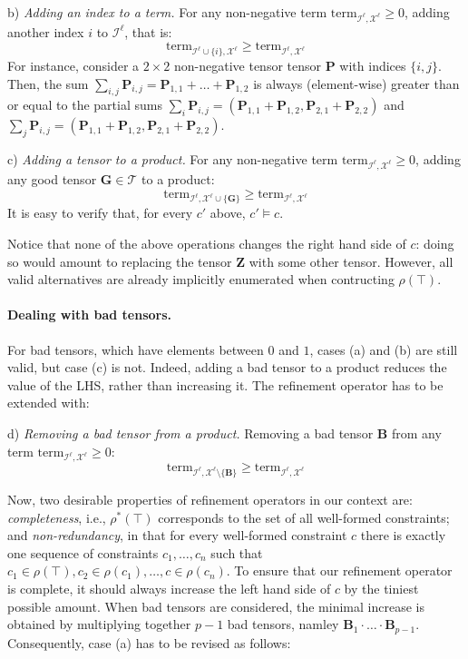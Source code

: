 \documentclass{article}
\newcommand{\tensors}{\ensuremath{\mathcal{T}}\xspace}
\newcommand{\indices}{\ensuremath{\mathcal{I}}\xspace}
\newcommand{\factors}{\ensuremath{\mathcal{X}}\xspace}
\newcommand{\TERM}[2]{\ensuremath{\mathrm{term}_{#1,#2}}\xspace}
\renewcommand\[{\begin{equation}}
\renewcommand\]{\end{equation}}
\newcommand{\TB}{\textbf{B}\xspace}
\newcommand{\TG}{\textbf{G}\xspace}
\newcommand{\TP}{\textbf{P}\xspace}
\newcommand{\TZ}{\textbf{Z}\xspace}
\begin{document}
b) \emph{Adding an index to a term.}  For any non-negative term
$\TERM{\indices^\ell}{\factors^\ell} \ge 0$, adding another index $i$ to
$\indices^\ell$, that is:
%
$$
    \textstyle
    \TERM{\indices^\ell \cup \{i\}}{\factors^\ell} \ge \TERM{\indices^\ell}{\factors^\ell}
$$
%
For instance, consider a $2 \times 2$ non-negative tensor tensor $\TP$ with
indices $\{i, j\}$.  Then, the sum
$\sum_{i,j} \TP_{i,j} = \TP_{1,1} + \ldots + \TP_{1,2}$
is always (element-wise) greater than or equal to the partial sums
$\sum_i \TP_{i,j} = (\TP_{1,1} + \TP_{1,2}, \TP_{2,1} + \TP_{2,2})$
and
$\sum_j \TP_{i,j} = (\TP_{1,1} + \TP_{1,2}, \TP_{2,1} + \TP_{2,2})$.

c) \emph{Adding a tensor to a product.}  For any non-negative term
$\TERM{\indices^\ell}{\factors^\ell} \ge 0$, adding any good tensor $\TG \in
\tensors$ to a product:
%
$$
    \textstyle
    \TERM{\indices^\ell}{\factors^\ell \cup \{\TG\}} \ge \TERM{\indices^\ell}{\factors^\ell}
$$
%
It is easy to verify that, for every $c'$ above, $c' \models c$.

Notice that none of the above operations changes the right hand side of $c$:
doing so would amount to replacing the tensor $\TZ$ with some other tensor.
However, all valid alternatives are already implicitly enumerated when
contructing $\rho(\top)$.


\paragraph{Dealing with bad tensors.}  For bad tensors, which have elements
between $0$ and $1$, cases (a) and (b) are still valid, but case (c) is not.
Indeed, adding a bad tensor to a product reduces the value of the LHS, rather
than increasing it.  The refinement operator has to be extended with:

d) \emph{Removing a bad tensor from a product.}   Removing a bad tensor $\TB$
from any term $\TERM{\indices^\ell}{\factors^\ell} \ge 0$:
%
$$
    \textstyle
    \TERM{\indices^\ell}{\factors^\ell \setminus \{\TB\}} \ge \TERM{\indices^\ell}{\factors^\ell}
$$

Now, two desirable properties of refinement operators in our context are:
%
\emph{completeness}, i.e., $\rho^*(\top)$ corresponds to the set of all
well-formed constraints; and
%
\emph{non-redundancy}, in that for every well-formed constraint $c$ there is
exactly one sequence of constraints $c_1, \ldots , c_n$ such that $c_1 \in
\rho(\top), c_2 \in \rho(c_1), \ldots, c \in \rho(c_n)$.
%
%
To ensure that our refinement operator is complete, it should always increase
the left hand side of $c$ by the tiniest possible amount.  When bad tensors are
considered, the minimal increase is obtained by multiplying together $p - 1$
bad tensors, namley $\TB_1 \cdot \ldots \cdot \TB_{p-1}$.  Consequently, case
(a) has to be revised as follows:
\end{document}
